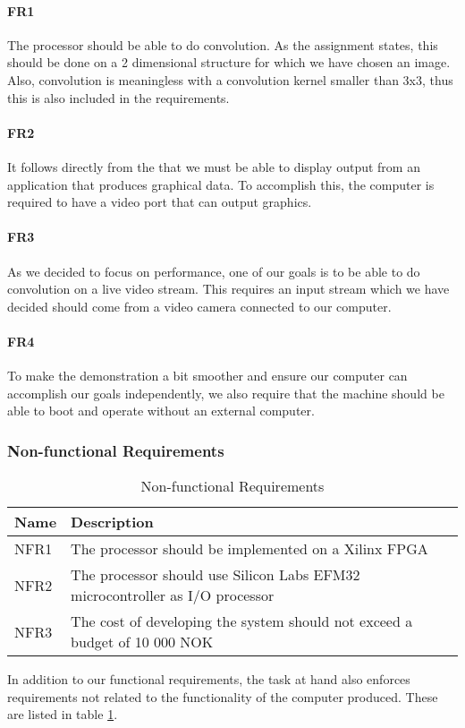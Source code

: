 \paragraph{FR1}
The processor should be able to do convolution.
As the assignment states, this should be done on a 2 dimensional structure for which we have chosen an image.
Also, convolution is meaningless with a convolution kernel smaller than 3x3, thus this is also included in the requirements.

\paragraph{FR2}
It follows directly from the  that we must be able to display output from an application that produces graphical data.
To accomplish this, the computer is required to have a video port that can output graphics.

\paragraph{FR3}
As we decided to focus on performance, one of our goals is to be able to do convolution on a live video stream.
This requires an input stream which we have decided should come from a video camera connected to our computer.

\paragraph{FR4}
To make the demonstration a bit smoother and ensure our computer can accomplish our goals independently, we also require that the machine should be able to boot and operate without an external computer.


\subsubsection{Non-functional Requirements}

\begin{table}[h]
    \centering
    \label{tab:non-functional-requirements}
    \begin{tabular}{lp{12cm}l}
        Name & Description \\
        \hline
        NFR1 &
            The processor should be implemented on a Xilinx FPGA \\
        NFR2 &
            The processor should use Silicon Labs EFM32 microcontroller as I/O processor \\
        NFR3 &
            The cost of developing the system should not exceed a budget of 10 000 NOK \\
    \end{tabular}
    \caption{Non-functional Requirements}
\end{table}

In addition to our functional requirements, the task at hand also enforces requirements not related to the functionality of the computer produced. These are listed in table \ref{tab:non-functional-requirements}.


